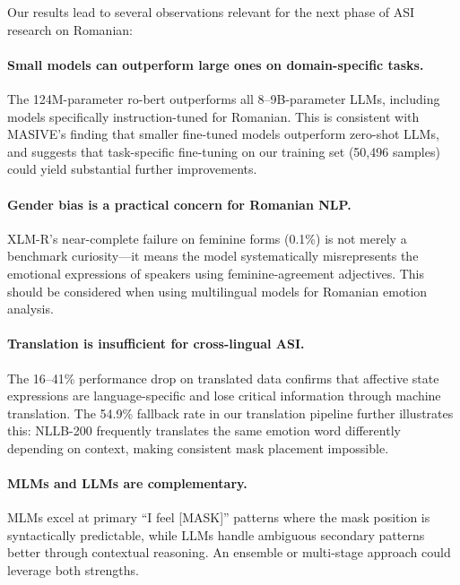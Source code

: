 \documentclass[11pt]{article}
\begin{document}
Our results lead to several observations relevant for the next phase of ASI research on Romanian:

\paragraph{Small models can outperform large ones on domain-specific tasks.} The 124M-parameter ro-bert outperforms all 8--9B-parameter LLMs, including models specifically instruction-tuned for Romanian. This is consistent with MASIVE's finding that smaller fine-tuned models outperform zero-shot LLMs, and suggests that task-specific fine-tuning on our training set (50,496 samples) could yield substantial further improvements.

\paragraph{Gender bias is a practical concern for Romanian NLP.} XLM-R's near-complete failure on feminine forms (0.1\%) is not merely a benchmark curiosity---it means the model systematically misrepresents the emotional expressions of speakers using feminine-agreement adjectives. This should be considered when using multilingual models for Romanian emotion analysis.

\paragraph{Translation is insufficient for cross-lingual ASI.} The 16--41\% performance drop on translated data confirms that affective state expressions are language-specific and lose critical information through machine translation. The 54.9\% fallback rate in our translation pipeline further illustrates this: NLLB-200 frequently translates the same emotion word differently depending on context, making consistent mask placement impossible.

\paragraph{MLMs and LLMs are complementary.} MLMs excel at primary ``I feel [MASK]'' patterns where the mask position is syntactically predictable, while LLMs handle ambiguous secondary patterns better through contextual reasoning. An ensemble or multi-stage approach could leverage both strengths.



\end{document}
